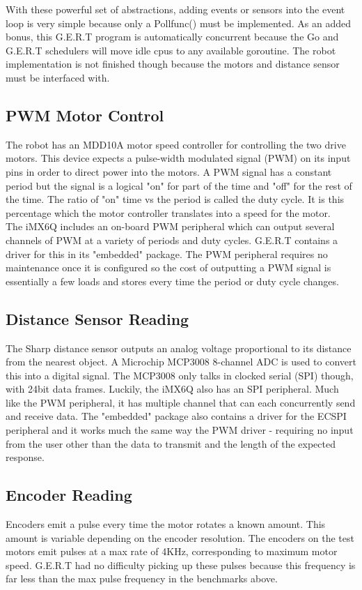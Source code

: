 With these powerful set of abstractions, adding events or sensors into the event loop
is very simple because only a Pollfunc() must be implemented. As an added bonus, this
G.E.R.T program is automatically concurrent because the Go and G.E.R.T schedulers will
move idle cpus to any available goroutine. The robot implementation is not finished though
because the motors and distance sensor must be interfaced with.

\subsection{PWM Motor Control}
The robot has an MDD10A motor speed controller for controlling the two drive motors. This device
expects a pulse-width modulated signal (PWM) on its input pins in order to direct power into the
motors. A PWM signal has a constant period but the signal is a logical "on" for part of the time
and "off" for the rest of the time. The ratio of "on" time vs the period is called the duty cycle.
It is this percentage which the motor controller translates into a speed for the motor.\\

The iMX6Q includes an on-board PWM peripheral which can output several channels of PWM
at a variety of periods and duty cycles. G.E.R.T contains a driver for this in its "embedded"
package. The PWM peripheral requires no maintenance once it is configured so the cost of outputting
a PWM signal is essentially a few loads and stores every time the period or duty cycle changes.

\subsection{Distance Sensor Reading}
The Sharp distance sensor outputs an analog voltage proportional to its distance from the nearest object.
A Microchip MCP3008 8-channel ADC is used to convert this into a digital signal. The MCP3008 only talks in clocked
serial (SPI) though, with 24bit data frames. Luckily, the iMX6Q also has an SPI peripheral. Much like the
PWM peripheral, it has multiple channel that can each concurrently send and receive data. The "embedded"
package also contains a driver for the ECSPI peripheral and it works much the same way the PWM driver - 
requiring no input from the user other than the data to transmit and the length of the expected response.

\subsection{Encoder Reading}
Encoders emit a pulse every time the motor rotates a known amount. This amount is variable depending on the
encoder resolution. The encoders on the test motors emit pulses at a max rate of 4KHz, corresponding to
maximum motor speed. G.E.R.T had no difficulty picking up these pulses because this frequency is far less than
the max pulse frequency in the benchmarks above.

